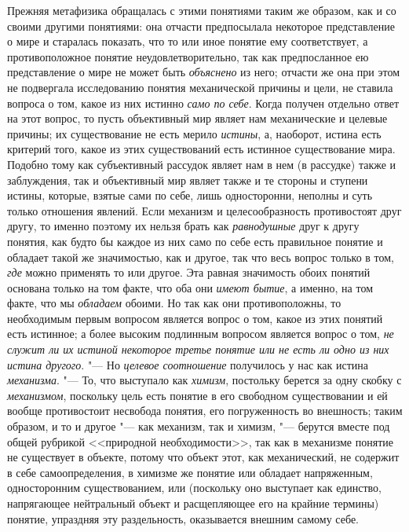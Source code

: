 Прежняя метафизика обращалась с этими понятиями таким же
образом, как и со своими другими понятиями: она отчасти предпосылала
некоторое представление о мире и старалась показать, что то или иное
понятие ему соответствует, а противоположное понятие неудовлетворительно,
так как предпосланное ею представление о мире не может быть
{\em объяснено} из него;
отчасти же она при этом не подвергала исследованию понятия механической
причины и цели, не ставила вопроса о том, какое из них истинно
{\em само по себе}. Когда
получен отдельно ответ на этот вопрос, то пусть объективный мир являет нам
механические и целевые причины; их существование не есть мерило
{\em истины}, а,
наоборот, истина есть критерий того, какое из этих существований есть
истинное существование мира. Подобно тому как субъективный рассудок являет
нам в нем (в рассудке) также и заблуждения, так и объективный мир являет
также и те стороны и ступени истины, которые, взятые сами по себе, лишь
односторонни, неполны и суть только отношения явлений. Если механизм и
целесообразность противостоят друг другу, то именно поэтому их нельзя брать
как {\em равнодушные}
друг к другу понятия, как будто бы каждое из них само по себе
есть правильное понятие и обладает такой же значимостью, как и другое, так
что весь вопрос только в том, {\em где}
можно применять то или другое. Эта равная
значимость обоих понятий основана только на том факте, что
оба они {\em имеют бытие},
а именно, на том факте, что мы
{\em обладаем} обоими. Но
так как они противоположны, то необходимым первым вопросом является вопрос
о том, какое из этих понятий есть истинное; а более высоким подлинным
вопросом является вопрос о том, {\em не
служит ли их истиной некоторое третье понятие или не есть ли одно из них
истина другого}. "--- Но
{\em целевое соотношение}
получилось у нас как истина
{\em механизма}. "--- То,
что выступало как {\em химизм},
постольку берется за одну скобку с
{\em механизмом},
поскольку цель есть понятие в его свободном существовании и
ей вообще противостоит несвобода понятия, его погруженность во внешность;
таким образом, и то и другое "--- как механизм, так и химизм,
"--- берутся вместе под общей рубрикой <<природной
необходимости>>, так как в механизме понятие не существует в объекте, потому
что объект этот, как механический, не содержит в себе самоопределения, в
химизме же понятие или обладает напряженным, односторонним существованием,
или (поскольку оно выступает как единство, напрягающее нейтральный объект и
расщепляющее его на крайние термины) понятие, упраздняя эту раздельность,
оказывается внешним самому себе.

